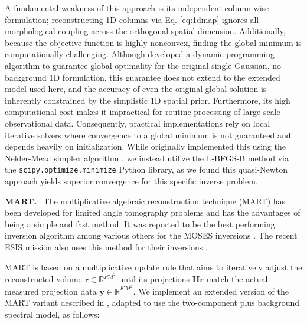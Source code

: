 \documentclass[linenumbers,twocolumn]{aastex7}
\begin{document}
A fundamental weakness of this approach is its independent column-wise
formulation; reconstructing 1D columns via Eq. \eqref{eq:1dmap} ignores all
morphological coupling across the orthogonal spatial dimension. Additionally,
because the objective function is highly nonconvex, finding the global minimum
is computationally challenging. Although \citet{oktem2014parametric} developed a
dynamic programming algorithm to guarantee global optimality for the original
single-Gaussian, no-background 1D formulation, this guarantee does not extend
to the extended model used here, and the accuracy of even the original global
solution is inherently constrained by the simplistic 1D spatial prior.
Furthermore, its high computational cost makes it impractical for routine
processing of large-scale observational data.  Consequently, practical
implementations rely on local iterative solvers where convergence to a global
minimum is not guaranteed and depends heavily on initialization. While
\citet{davila2019slitless} originally implemented this using the Nelder-Mead
simplex algorithm \citep{nelder1965simplex}, we instead utilize the L-BFGS-B
method \citep{zhu1997algorithm} via the \lstinline|scipy.optimize.minimize|
Python library, as we found this quasi-Newton approach yields superior
convergence for this specific inverse problem.

\noindent
\textbf{MART.} \ The multiplicative algebraic reconstruction technique (MART)
has been developed for limited angle tomography problems
\citep{gordon1970algebraic, okamoto1991simultaneous} and has the
advantages of being a simple and fast method. It was reported to be the best
performing inversion algorithm among various others for the MOSES inversions
\citep{fox2011snapshot}. The recent ESIS mission also uses this method for
their inversions \citep{parker2022first}.

MART is based on a multiplicative update rule that aims to iteratively adjust
the reconstructed volume $\bm r \in \mathbb R^{PM^2}$ until its projections $\bm
H \bm r$ match the actual measured projection data $\bm y\in \mathbb R^{KM^2}$.
We implement an extended version of the MART variant described in
\cite{parker2022first}, adapted to use the two-component plus background
spectral model, as follows:
\end{document}
